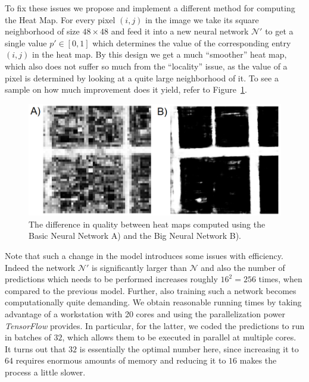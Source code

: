 \documentclass[10pt,conference,compsocconf]{IEEEtran}
\newcommand{\cN}{\mathcal{N}}
\begin{document}
To fix these issues we propose and implement a different method for computing the Heat Map. For every pixel $(i,j)$ in the image we take its square neighborhood of size $48\times 48$ and feed it into a new neural network $\cN'$ to get a single value $p'\in [0,1]$ which determines the value of the corresponding entry $(i,j)$ in the heat map. By this design we get a much ``smoother'' heat map, which also does not suffer so much from the ``locality'' issue, as the value of a pixel is determined by looking at a quite large neighborhood of it. To see a sample on how much improvement does it yield, refer to Figure~\ref{fig:smallbig}.
\begin{figure}
\includegraphics[scale=0.42]{smallbig.png}
\caption{The difference in quality between heat maps computed using the Basic Neural Network A) and the Big Neural Network B).}
\label{fig:smallbig}
\end{figure}
Note that such a change in the model introduces some issues with efficiency. Indeed the network $\cN'$ is significantly larger than $\cN$ and also the number of predictions which needs to be performed increases roughly $16^2=256$ times, when compared to the previous model. Further, also training such a network becomes computationally quite demanding. We obtain reasonable running times by taking advantage of a workstation with 20 cores and using the parallelization power {\it TensorFlow} provides. In particular, for the latter, we coded the predictions to run in batches of $32$, which allows them to be executed in parallel at multiple cores. It turns out that $32$ is essentially the optimal number here, since increasing it to $64$ requires enormous amounts of memory and reducing it to $16$ makes the process a little slower.
\end{document}
